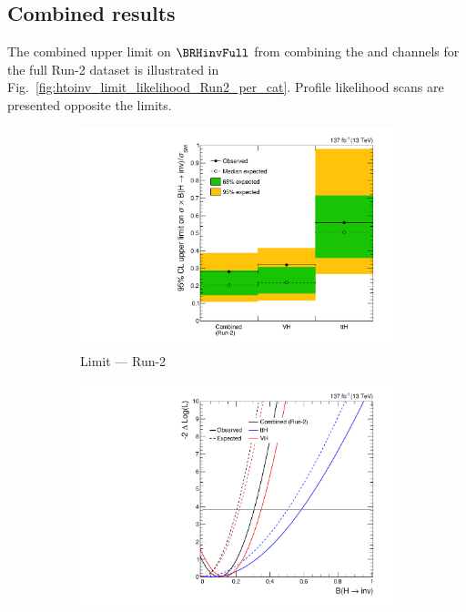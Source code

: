 \clearpage




\subsection{Combined results}
\label{subsec:htoinv_combined_results}

The combined upper limit on $\BRHinvFull$ from combining the \ttH and \VH channels for the full Run-2 dataset is illustrated in Fig.~\ref{fig:htoinv_limit_likelihood_Run2_per_cat}. Profile likelihood scans are presented opposite the limits.

\begin{figure}[htbp]
    \centering
    \begin{subfigure}[t]{0.45\textwidth}  %
        \includegraphics[width=\textwidth]{figures/limits/full_Run2/limit_Run2_comb_per_cat.pdf}
        \caption{Limit --- Run-2}
    \end{subfigure}
    \hspace{0.05\textwidth}
    \begin{subfigure}[t]{0.45\textwidth}
        \includegraphics[width=\textwidth]{figures/likelihood_scan/profile_likelihood_scan_Run2_per_cat.pdf}

\end{subfigure}
\end{figure}
